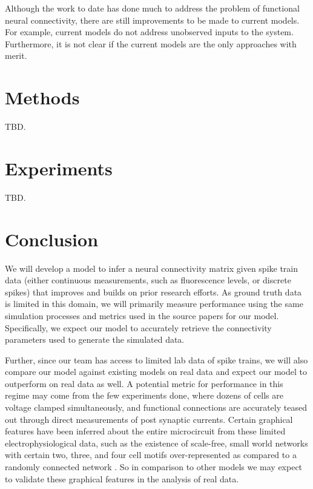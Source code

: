 \documentclass{article}
\begin{document}
Although the work to date has done much to address the problem of
functional neural connectivity, there are still improvements to be
made to current models. For example, current models do not address
unobserved inputs to the system. Furthermore, it is not clear if
the current models are the only approaches with merit.

\section{Methods}
TBD.
\section{Experiments}
TBD.

\section{Conclusion}
We will develop a model to infer a neural connectivity matrix given spike train data (either continuous measurements, such as fluorescence levels, or discrete spikes) that improves and builds on prior research efforts. As ground truth data is limited in this domain, we will primarily measure performance using the same simulation processes and metrics used in the source papers for our model.  Specifically, we expect our model to accurately retrieve the connectivity parameters used to generate the simulated data.  

Further, since our team has access to limited lab data of spike trains, we will also compare our model against existing models on real data and expect our model to outperform on real data as well.  A potential metric for performance in this regime may come from the few experiments done, where dozens of cells are voltage clamped simultaneously, and functional connections are accurately teased out through direct measurements of post synaptic currents.  Certain graphical features have been inferred about the entire microcircuit from these limited electrophysiological data, such as the existence of scale-free, small world networks with certain two, three, and four cell motifs over-represented as compared to a randomly connected network \citep{song2005,perin2011}.  So in comparison to other models we may expect to validate these graphical features in the analysis of real data.

\begin{small}

 
\end{small}
\end{document}
